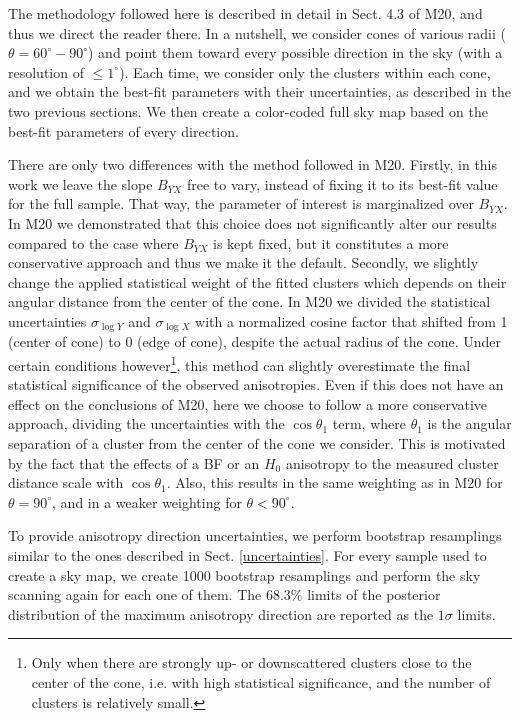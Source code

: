 \documentclass{aa}   %
\begin{document}
The methodology followed here is described in detail in Sect. 4.3 of M20, and thus we direct the reader there. In a nutshell, we consider cones of various radii ($\theta = 60^{\circ}-90^{\circ}$) and point them toward every possible direction in the sky (with a resolution of $\leq 1^{\circ}$). Each time, we consider only the clusters within each cone, and we obtain the best-fit parameters with their uncertainties, as described in the two previous sections. We then create a color-coded full sky map based on the best-fit parameters of every direction.

There are only two differences with the method followed in M20. Firstly, in this work we leave the slope $B_{YX}$ free to vary, instead of fixing it to its best-fit value for the full sample. That way, the parameter of interest is marginalized over $B_{YX}$. In M20 we demonstrated that this choice does not significantly alter our results compared to the case where $B_{YX}$ is kept fixed, but it constitutes a more conservative approach and thus we make it the default. Secondly, we slightly change the applied statistical weight of the fitted clusters which depends on their angular distance from the center of the cone. In M20 we divided the statistical uncertainties $\sigma _{\log{Y}}$ and $\sigma _{\log{X}}$ with a normalized cosine factor that shifted from 1 (center of cone) to 0 (edge of cone), despite the actual radius of the cone. Under certain conditions however\footnote{Only when there are strongly up- or downscattered clusters close to the center of the cone, i.e. with high statistical significance, and the number of clusters is relatively small.}, this method can slightly overestimate the final statistical significance of the observed anisotropies. Even if this does not have an effect on the conclusions of M20, here we choose to follow a more conservative approach, dividing the uncertainties with the $\cos{\theta_1}$ term, where $\theta_1$ is the angular separation of a cluster from the center of the cone we consider. This is motivated by the fact that the effects of a BF or an $H_0$ anisotropy to the measured cluster distance scale with $\cos{\theta_1}$. Also, this results in the same weighting as in M20 for $\theta=90^{\circ}$, and in a weaker weighting for $\theta<90^{\circ}$.

To provide anisotropy direction uncertainties, we perform bootstrap resamplings similar to the ones described in Sect. \ref{uncertainties}. For every sample used to create a sky map, we create 1000 bootstrap resamplings and perform the sky scanning again for each one of them. The $68.3\%$ limits of the posterior distribution of the maximum anisotropy direction are reported as the $1\sigma$ limits.
\end{document}
